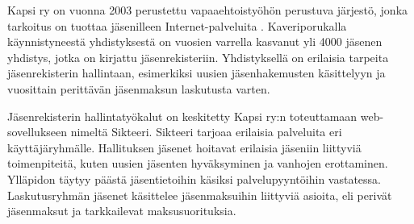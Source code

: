 Kapsi ry on vuonna 2003 perustettu vapaaehtoistyöhön perustuva järjestö, jonka tarkoitus on tuottaa jäsenilleen Internet-palveluita \cite{kapsifi}. Kaveriporukalla käynnistyneestä yhdistyksestä on vuosien varrella kasvanut yli 4000 jäsenen yhdistys, jotka on kirjattu jäsenrekisteriin. Yhdistyksellä on erilaisia tarpeita jäsenrekisterin hallintaan, esimerkiksi uusien jäsenhakemusten käsittelyyn ja vuosittain perittävän jäsenmaksun laskutusta varten.

Jäsenrekisterin hallintatyökalut on keskitetty Kapsi ry:n toteuttamaan web-sovellukseen nimeltä Sikteeri. Sikteeri tarjoaa erilaisia palveluita eri käyttäjäryhmälle. Hallituksen jäsenet hoitavat erilaisia jäseniin liittyviä toimenpiteitä, kuten uusien jäsenten hyväksyminen ja vanhojen erottaminen. Ylläpidon täytyy päästä jäsentietoihin käsiksi palvelupyyntöihin vastatessa. Laskutusryhmän jäsenet käsittelee jäsenmaksuihin liittyviä asioita, eli perivät jäsenmaksut ja tarkkailevat maksusuorituksia.